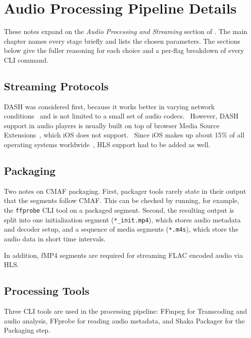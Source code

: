 \label{ch:appendix}


\chapter{Audio Processing Pipeline Details}\label{app:audio_details}
These notes expand on the \textit{Audio Processing and Streaming}
section of . The main chapter names every
stage briefly and lists the chosen parameters. The sections below give
the fuller reasoning for each choice and a per-flag breakdown of every
CLI command.


\section{Streaming Protocols}
DASH was considered first, because it works better in varying network
conditions~\parencite{hls_vs_dash} and is not limited to a small set
of audio codecs.~\parencite{dash_technical} However, DASH support in
audio players is usually built on top of browser Media Source
Extensions~\parencite{mse}, which iOS does not
support.~\parencite{msecaniuse} Since iOS makes up about 15\% of all
operating systems worldwide~\parencite{os_percentage}, HLS support had
to be added as well.


\section{Packaging}
Two notes on CMAF packaging. First, packager tools rarely state in
their output that the segments follow CMAF\@. This can be checked by
running, for example, the \texttt{ffprobe} CLI tool on a packaged
segment. Second, the resulting output is split into one initialization
segment (\texttt{*\_init.mp4}), which stores audio metadata and
decoder setup, and a sequence of media segments (\texttt{*.m4s}),
which store the audio data in short time intervals.

In addition, fMP4 segments are required for streaming FLAC encoded
audio via HLS\@.~\parencite{apple_hls_specs_flac_container}


\section{Processing Tools}
Three CLI tools are used in the processing pipeline: FFmpeg for
Transcoding and audio analysis, FFprobe for reading audio metadata,
and Shaka Packager for the Packaging step.

